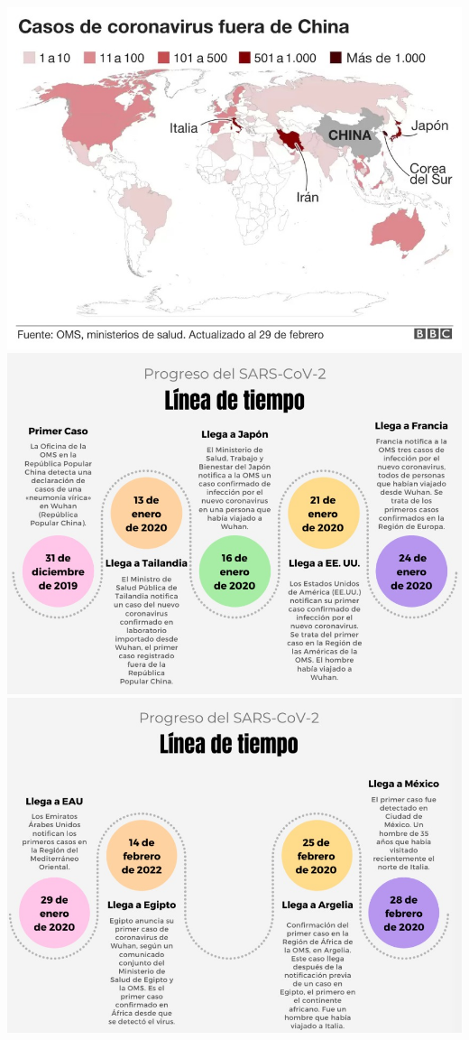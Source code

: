 \documentclass[
  12pt,
]{article}
\begin{document}
\includegraphics{Archivos/Image1.jpeg}
\includegraphics{Archivos/Image2.jpeg}
\includegraphics{Archivos/Image3.jpeg}
\end{document}
